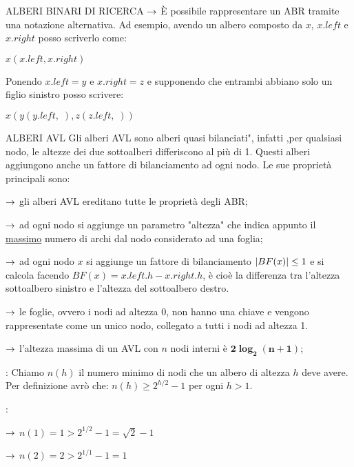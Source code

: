 \documentclass[8pt]{extarticle}
\begin{document}
\begin{formulario}
\begin{myParagraph}{ALBERI BINARI DI RICERCA}
 $\rightarrow$ È possibile rappresentare un ABR tramite una notazione alternativa. Ad esempio, avendo un albero composto da $x$, $x.left$ e $x.right$ posso scriverlo come:\\
			\begin{tcenter}
$x(x.left,x.right)$
			\end{tcenter}
Ponendo $x.left=y$ e $x.right=z$ e supponendo che entrambi abbiano solo un figlio sinistro posso scrivere:
			\begin{tcenter}
$x(y(y.left,\;),z(z.left,\;))$
			\end{tcenter}
		\end{myParagraph}

	\begin{myParagraph}{ALBERI AVL}
Gli alberi AVL sono alberi quasi bilanciati", infatti ,per qualsiasi nodo, le altezze dei due sottoalberi differiscono al più di 1. Questi alberi aggiungono anche un fattore di bilanciamento ad ogni nodo. Le sue proprietà principali sono:
		\begin{Descr}
			\item[Proprietà ereditate dagli ABR] $\rightarrow$ gli alberi AVL ereditano tutte le proprietà degli ABR;
			\item[Altezza dei Nodi] $\rightarrow$ ad ogni nodo si aggiunge un parametro "altezza" che indica appunto il \underline{massimo} numero di archi dal nodo considerato ad una foglia;
			\item[Fattore di Bilanciamento] $\rightarrow$ ad ogni nodo $x$ si aggiunge un fattore di bilanciamento $\left\vert BF(x) \right\vert\leq 1$ e si calcola facendo $BF(x)=x.left.h-x.right.h$, è cioè la differenza tra l'altezza sottoalbero sinistro e l'altezza del sottoalbero destro.
			\item[Sentinella T.NIL] $\rightarrow$ le foglie, ovvero i nodi ad altezza 0, non hanno una chiave e vengono rappresentate come un unico nodo, collegato a tutti i nodi ad altezza 1.
			\item[Altezza Massima] $\rightarrow$ l'altezza massima di un AVL con $n$ nodi interni è $\bm{2\log_2 (n+1)}$;
			\begin{Descr}
				\item[Teorema]: Chiamo $n(h)$ il numero minimo di nodi che un albero di altezza $h$ deve avere. Per definizione avrò che: $n(h)\geq 2^{h/2}-1$ per ogni $h>1$.
				\item[Dimostrazione]:
				\begin{Descr}
					\item[h=1] $\rightarrow$ $n(1)=1 > 2^{1/2}-1=\sqrt{2}-1$
					\item[h=2] $\rightarrow$ $n(2)=2 > 2^{1/1}-1=1$

\end{Descr}
\end{Descr}
\end{Descr}
\end{myParagraph}
\end{formulario}
\end{document}
